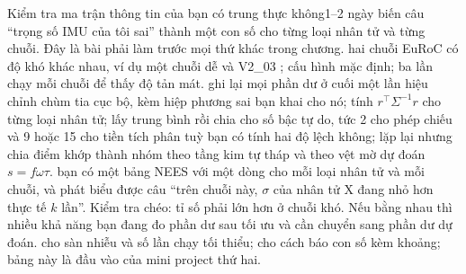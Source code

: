 \documentclass[../../deep_learning.tex]{subfiles}
\begin{document}
\begin{ungdung}
\end{ungdung}

\begin{duan}{Kiểm tra ma trận thông tin của bạn có trung thực không}{1--2 ngày}
\dmt biến câu ``trọng số IMU của tôi sai'' thành một con số cho từng loại nhân tử và từng chuỗi. Đây là bài phải làm trước mọi thứ khác trong chương.
\ddl hai chuỗi EuRoC có độ khó khác nhau, ví dụ một chuỗi dễ và V2\_03 \cite{burri2016euroc}; cấu hình mặc định; ba lần chạy mỗi chuỗi để thấy độ tản mát.
\dbc ghi lại mọi phần dư ở cuối một lần hiệu chỉnh chùm tia cục bộ, kèm hiệp phương sai bạn khai cho nó; tính \(r^{\top}\Sigma^{-1}r\) cho từng loại nhân tử; lấy trung bình rồi chia cho số bậc tự do, tức 2 cho phép chiếu và 9 hoặc 15 cho tiền tích phân tuỳ bạn có tính hai độ lệch không; lặp lại nhưng chia điểm khớp thành nhóm theo tầng kim tự tháp và theo vệt mờ dự đoán \(s=f\omega\tau\).
\dxk bạn có một bảng NEES với một dòng cho mỗi loại nhân tử và mỗi chuỗi, và phát biểu được câu ``trên chuỗi này, \(\sigma\) của nhân tử X đang nhỏ hơn thực tế \(k\) lần''. Kiểm tra chéo: tỉ số phải lớn hơn ở chuỗi khó. Nếu bằng nhau thì nhiều khả năng bạn đang đo phần dư sau tối ưu và cần chuyển sang phần dư dự đoán.
\dnv {} cho sàn nhiễu và số lần chạy tối thiểu;  cho cách báo con số kèm khoảng; bảng này là đầu vào của mini project thứ hai.
\end{duan}
\end{document}
